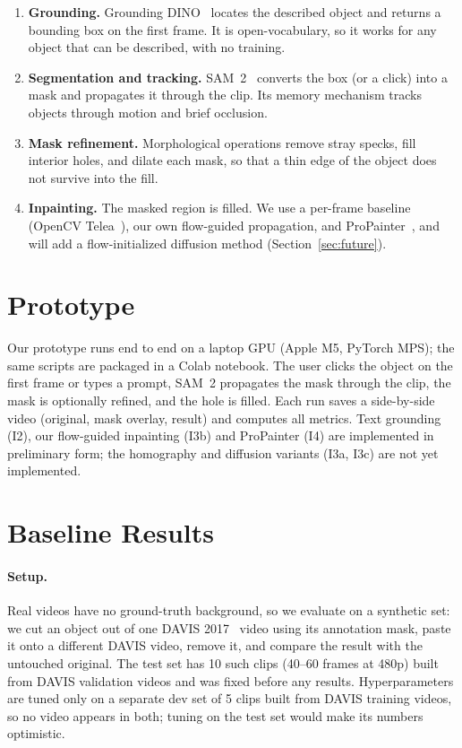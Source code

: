 \documentclass[11pt]{article}
\begin{document}
\begin{enumerate}
  \item \textbf{Grounding.} Grounding DINO~\cite{liu2024grounding} locates the described object and returns a bounding box on the first frame. It is open-vocabulary, so it works for any object that can be described, with no training.
  \item \textbf{Segmentation and tracking.} SAM~2~\cite{ravi2024sam2} converts the box (or a click) into a mask and propagates it through the clip. Its memory mechanism tracks objects through motion and brief occlusion.
  \item \textbf{Mask refinement.} Morphological operations remove stray specks, fill interior holes, and dilate each mask, so that a thin edge of the object does not survive into the fill.
  \item \textbf{Inpainting.} The masked region is filled. We use a per-frame baseline (OpenCV Telea~\cite{telea2004}), our own flow-guided propagation, and ProPainter~\cite{zhou2023propainter}, and will add a flow-initialized diffusion method (Section~\ref{sec:future}).
\end{enumerate}

\section{Prototype}
Our prototype runs end to end on a laptop GPU (Apple M5, PyTorch MPS); the same scripts are packaged in a Colab notebook. The user clicks the object on the first frame or types a prompt, SAM~2 propagates the mask through the clip, the mask is optionally refined, and the hole is filled. Each run saves a side-by-side video (original, mask overlay, result) and computes all metrics. Text grounding (I2), our flow-guided inpainting (I3b) and ProPainter (I4) are implemented in preliminary form; the homography and diffusion variants (I3a, I3c) are not yet implemented.

\section{Baseline Results}
\paragraph{Setup.} Real videos have no ground-truth background, so we evaluate on a synthetic set: we cut an object out of one DAVIS 2017~\cite{pont2017davis} video using its annotation mask, paste it onto a different DAVIS video, remove it, and compare the result with the untouched original. The test set has 10 such clips (40--60 frames at 480p) built from DAVIS validation videos and was fixed before any results. Hyperparameters are tuned only on a separate dev set of 5 clips built from DAVIS training videos, so no video appears in both; tuning on the test set would make its numbers optimistic.
\end{document}
